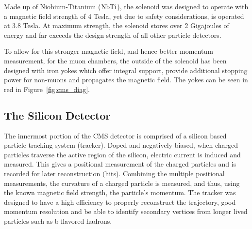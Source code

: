 Made up of Niobium-Titanium ($\rm NbTi$), the solenoid was designed to operate
with a magnetic field strength of 4 Tesla, yet due to safety considerations,
is operated at 3.8 Tesla. At maximum strength, the solenoid stores over 2
Gigajoules of energy and far exceeds the design strength of all other particle
detectors.

To allow for this stronger magnetic field, and hence better momentum
measurement, for the muon chambers, the outside of the solenoid has been
designed with iron yokes which offer integral support, provide additional
stopping power for non-muons and propagates the magnetic field. The yokes can
be seen in red in Figure~\ref{fig:cms_diag}.

\subsection{The Silicon Detector}
\label {sec:cms_silicon}
The innermost portion of the CMS detector is comprised of a silicon based
particle tracking system (tracker). Doped and negatively biased, when charged
particles traverse the active region of the silicon, electric current is
induced and measured. This gives a positional measurement of the charged
particles and is recorded for later reconstruction (hits). Combining the
multiple positional measurements, the curvature of a charged particle is
measured, and thus, using the known magnetic field strength, the particle's
momentum. The tracker was designed to have a high efficiency to properly
reconstruct the trajectory, good momentum resolution and be able to identify
secondary vertices from longer lived particles such as b-flavored hadrons.

